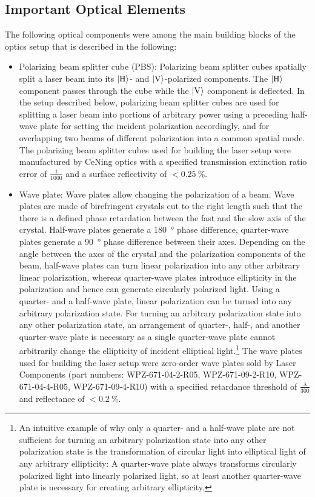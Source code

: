 \subsection*{Important Optical Elements}
The following optical components were among the main building blocks of the optics setup that is described in the following:
\begin{itemize}
    \item Polarizing beam splitter cube (PBS): Polarizing beam splitter cubes spatially split a laser beam into its $\Ket{\text{H}}$- and $\Ket{\text{V}}$-polarized components. The $\Ket{\text{H}}$ component passes through the cube while the $\Ket{\text{V}}$ component is deflected. In the setup described below, polarizing beam splitter cubes are used for splitting a laser beam into portions of arbitrary power using a preceding half-wave plate for setting the incident polarization accordingly, and for overlapping two beams of different polarization into a common spatial mode. The polarizing beam splitter cubes used for building the laser setup were manufactured by CeNing optics with a specified transmission extinction ratio error of $\frac{1}{1000}$ and a surface reflectivity of $<\SI{0.25}{\percent}$.
    \item Wave plate: Wave plates allow changing the polarization of a beam. Wave plates are made of birefringent crystals cut to the right length such that the there is a defined phase retardation between the fast and the slow axis of the crystal. Half-wave plates generate a \SI{180}{\degree} phase difference, quarter-wave plates generate a \SI{90}{\degree} phase difference between their axes. Depending on the angle between the axes of the crystal and the polarization components of the beam, half-wave plates can turn linear polarization into any other arbitrary linear polarization, whereas quarter-wave plates introduce ellipticity in the polarization and hence can generate circularly polarized light. Using a quarter- and a half-wave plate, linear polarization can be turned into any arbitrary polarization state. For turning an arbitrary polarization state into any other polarization state, an arrangement of quarter-, half-, and another quarter-wave plate is necessary as a single quarter-wave plate cannot arbitrarily change the ellipticity of incident elliptical light.\footnote{An intuitive example of why only a quarter- and a half-wave plate are not sufficient for turning an arbitrary polarization state into any other polarization state is the transformation of circular light into elliptical light of any arbitrary ellipticity: A quarter-wave plate always transforms circularly polarized light into linearly polarized light, so at least another quarter-wave plate is necessary for creating arbitrary ellipticity.} The wave plates used for building the laser setup were zero-order wave plates sold by Laser Components (part numbers:  WPZ-671-04-2-R05, WPZ-671-09-2-R10, WPZ-671-04-4-R05,  WPZ-671-09-4-R10) with a specified retardance threshold of $\frac{\lambda}{300}$ and reflectance of $<\SI{0.2}{\percent}$.

\end{itemize}

